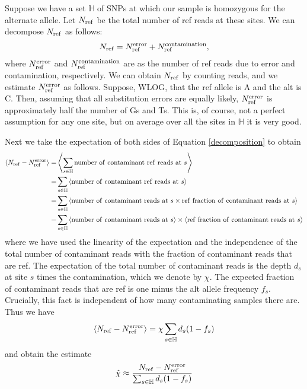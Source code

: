 \documentclass[nofootinbib,amssymb,amsmath]{revtex4}
\newcommand{\ave}[1]{\left\langle #1 \right\rangle}
\begin{document}
Suppose we have a set $\mathbb{H}$ of SNPs at which our sample is homozygous for the alternate allele.  Let $N_{\rm ref}$ be the total number of ref reads at these sites.  We can decompose $N_{\rm ref}$ as follows:
\begin{align}
N_{\rm ref} = N_{\rm ref}^{\rm error} + N_{\rm ref}^{\rm contamination}, \label{decomposition}
\end{align}
where $N_{\rm ref}^{\rm error}$  and $N_{\rm ref}^{\rm contamination}$ are as the number of ref reads due to error and contamination, respectively.  We can obtain $N_{\rm ref}$ by counting reads, and we estimate $N_{\rm ref}^{\rm error}$ as follows.  Suppose, WLOG, that the ref allele is A and the alt is C.  Then, assuming that all substitution errors are equally likely, $N_{\rm ref}^{\rm error}$ is approximately half the number of Gs and Ts.  This is, of course, not a perfect assumption for any one site, but on average over all the sites in $\mathbb{H}$ it is very good.

Next we take the expectation of both sides of Equation \ref{decomposition} to obtain
\begin{align}
\ave{N_{\rm ref} - N_{\rm ref}^{\rm error}} =& \ave{\sum_{s \in \mathbb{H}} {\rm number~of~contaminant~ref~reads~at~}s} \\
=& \sum_{s \in \mathbb{H}} \ave{{\rm number~of~contaminant~ref~reads~at~}s} \\
=& \sum_{s \in \mathbb{H}} \ave{{\rm number~of~contaminant~reads~at~}s \times {\rm ref~fraction~of~contaminant~reads~at~}s} \\
=& \sum_{s \in \mathbb{H}} \ave{{\rm number~of~contaminant~reads~at~}s} \times \ave{{\rm ref~fraction~of~contaminant~reads~at~}s}
\end{align}
where we have used the linearity of the expectation and the independence of the total number of contaminant reads with the fraction of contaminant reads that are ref.  The expectation of the total number of contaminant reads is the depth $d_s$ at site $s$ times the contamination, which we denote by $\chi$.  The expected fraction of contaminant reads that are ref is one minus the alt allele frequency $f_s$.  Crucially, this fact is independent of how many contaminating samples there are.  Thus we have
\begin{align}
\ave{N_{\rm ref} - N_{\rm ref}^{\rm error}} = \chi \sum_{s \in \mathbb{H}} d_s (1 - f_s)
\end{align}
and obtain the estimate
\begin{align}
\hat{\chi} \approx \frac{N_{\rm ref} - N_{\rm ref}^{\rm error}}{\sum_{s \in \mathbb{H}} d_s (1 - f_s)} \label{contamination_estimate}
\end{align}
\end{document}
